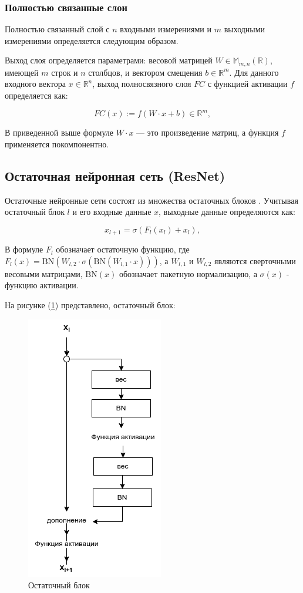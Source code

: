 \subsubsection*{Полностью связанные слои}

Полностью связанный слой с \(n\) входными измерениями и \(m\) выходными измерениями определяется следующим образом.

Выход слоя определяется параметрами: весовой матрицей \(W \in \mathbb{M}_{m,n}(\mathbb{R})\), имеющей \(m\) строк и \(n\) столбцов, и вектором смещения \(b \in \mathbb{R}^{m}\). Для данного входного вектора \(x \in \mathbb{R}^{n}\), выход полносвязного слоя \(FC\) с функцией активации \(f\) определяется как:

\begin{equation}
    FC(x) := f(W \cdot x + b) \in \mathbb{R}^{m}
, \end{equation}

В приведенной выше формуле \(W \cdot x\) — это произведение матриц, а функция \(f\) применяется покомпонентно.

\subsection{Остаточная нейронная сеть (ResNet)}

Остаточные нейронные сети состоят из множества остаточных блоков \cite{he2016deep}. Учитывая остаточный блок \(l\) и его входные данные \(x\), выходные данные определяются как:

\begin{equation}
    x_{l + 1} = \sigma(F_{l}(x_{l}) + x_{l})
, \end{equation}

В формуле \(F_{l}\) обозначает остаточную функцию, где \(F_{l}(x) = \text{BN}(W_{l,2} \cdot \sigma(\text{BN}(W_{l,1} \cdot x)))\), а \(W_{l,1}\) и \(W_{l,2}\) являются сверточными весовыми матрицами, \(\text{BN}(x)\) обозначает пакетную нормализацию, а \(\sigma(x)\) - функцию активации.

На рисунке (\ref{fig:residual-block}) представлено, остаточный блок: 
\begin{figure}[H]
	\centering
	\includegraphics[width=0.3\linewidth]{assets/residual-block.png}
	\caption{Остаточный блок}
	\label{fig:residual-block}
\end{figure}

